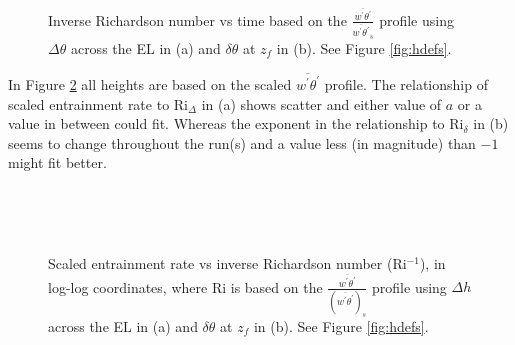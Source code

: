 \begin{figure}[htbp]
\begin{minipage}[b]{0.5\linewidth}
         
        \\
        \end{minipage}             
\quad
\begin{minipage}[b]{0.5\linewidth}
        \\
       
       \end{minipage}
        \caption[Richardson numbers based on $\frac{\overline{w^{'}\theta^{'}}}{\overline{w^{'}\theta^{'}}_{s}}$]{Inverse Richardson number vs time based on the $\frac{\overline{w^{'}\theta^{'}}}{\overline{w^{'}\theta^{'}}_{s}}$
profile using $\Delta \theta$ across the \acs{EL} in (a) and $\delta \theta$ at $z_{f}$ in (b).  See Figure \ref{fig:hdefs}.}
        \label{fig:invristime_f}
\end{figure}

In Figure \ref{fig:weinvri_f} all heights are based on the scaled $\overline{w^{'}\theta^{'}}$ profile. The relationship of scaled entrainment rate to \acs{Ri}$_{\Delta}$ in (a) shows scatter and either value of $a$ or a value in between could fit.  Whereas the exponent in the relationship to \acs{Ri}$_{\delta}$ in (b) seems to change throughout the run(s) and a value less (in magnitude) than $-1$ might fit better. \\    

\begin{figure}[htbp]
\begin{minipage}[b]{0.5\linewidth}
        \\
        \end{minipage}             
\quad
\begin{minipage}[b]{0.5\linewidth}
        \\
       
       \end{minipage}
        \caption[Scaled entrainment rate vs inverse Richardson number (ii)]{Scaled entrainment rate vs inverse Richardson number (\acs{Ri}$^{-1}$), in log-log coordinates, where \acs{Ri} is based on the $\frac{\overline{w^{'}\theta^{'}}}{(\overline{w^{'}\theta^{'}})_{s}}$
profile using $\Delta h$ across the \acs{EL} in (a) and $\delta \theta$ at $z_{f}$ in (b).  See Figure \ref{fig:hdefs}.}
        \label{fig:weinvri_f}
\end{figure}

